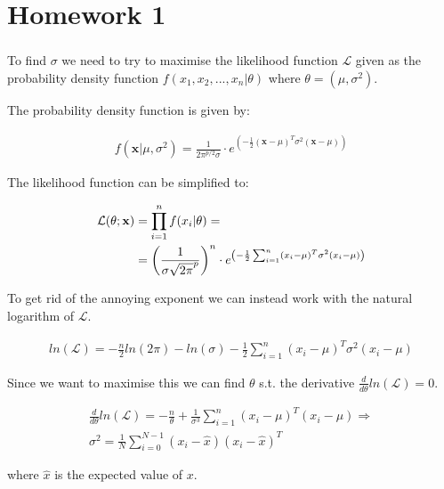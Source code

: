 \documentclass{article}
\begin{document}
\chapter{Homework 1}
\setcounter{section}{1}
\subsection{}

To find $\sigma$ we need to try to maximise the likelihood function
$\mathcal{L}$ given as the probability density function $f(x_1, x_2, ... , x_n
\vert \theta)$ where $\theta = (\mu, \sigma^2)$.

The probability density function is given by:

\begin{align}
  f(\mathbf{x} \vert \mu , \sigma^2) = \frac{1}{2\pi^{p / 2} \sigma}
  \cdot e^{\left( - \frac{1}{2} \left( \mathbf{x} - \mu \right) ^T
  \sigma^2 \left(\mathbf{x} - \mu \right) \right)}
\end{align}

The likelihood function can be simplified to:

\begin{align}
  \mathcal{L}(\theta ; \mathbf{x}) &= \prod_{i = 1}^{n}f(x_i \vert \theta) =\\
  \notag &= \left( \frac{1}{\sigma\sqrt{2\pi}^{p}} \right) ^n
    \cdot e^{\left( - \frac{1}{2} \sum_{i = 1}^{n}
    \notag \left( x_i - \mu \right) ^T \sigma^2 \left(x_i - \mu \right) \right)}
\end{align}

To get rid of the annoying exponent we can instead work with the natural
logarithm of $\mathcal{L}$.

\begin{align}
  ln(\mathcal{L}) = - \frac{n}{2} ln(2\pi) - ln(\sigma)
    - \frac{1}{2} \sum_{i = 1}^{n}
    \left( x_i - \mu \right) ^T \sigma^2 \left(x_i - \mu \right)
\end{align}

Since we want to maximise this we can find $\theta$ s.t. the derivative
$\frac{d}{d\theta}ln(\mathcal{L}) = 0$.

\begin{align}
  \frac{d}{d\theta}ln(\mathcal{L}) = -\frac{n}{\theta} + \frac{1}{\sigma^3}
  \sum_{i = 1}^{n} \left( x_i - \mu \right) ^T \left(x_i - \mu \right) \Rightarrow \\
  \sigma^2 = \frac{1}{N} \sum_{i = 0}^{N - 1}
    \left( x_i - \hat{x} \right) \left(x_i - \hat{x} \right)^T
\end{align}

where $\hat{x}$ is the expected value of $x$.
\end{document}
